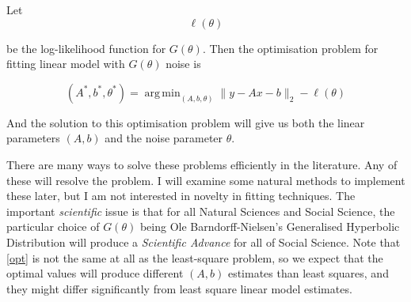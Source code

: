 \documentclass{amsart}
\DeclareMathOperator*{\argmin}{arg\,min}
\begin{document}
Let
\begin{equation}
\ell(\theta)
\end{equation}

be the log-likelihood function for $G(\theta)$.  Then the optimisation problem for fitting linear model with $G(\theta)$ noise is

\begin{equation}
\label{opt}
(A^*,b^*,\theta^*) = \argmin_{(A,b,\theta)} \| y - Ax - b \|_2 - \ell(\theta)
\end{equation}

And the solution to this optimisation problem will give us both the linear parameters $(A,b)$ and the noise parameter $\theta$.

There are many ways to solve these problems efficiently in the literature.  Any of these will resolve the problem.  I will examine some natural methods to implement these later, but I am not interested in novelty in fitting techniques.  The important {\em scientific} issue is that for all Natural Sciences and Social Science, the particular choice of $G(\theta)$ being Ole Barndorff-Nielsen's Generalised Hyperbolic Distribution will produce a {\em Scientific Advance} for all of Social Science.  Note that \eqref{opt} is not the same at all as the least-square problem, so we expect that the optimal values will produce different $(A,b)$ estimates than least squares, and they might differ significantly from least square linear model estimates.
\end{document}
